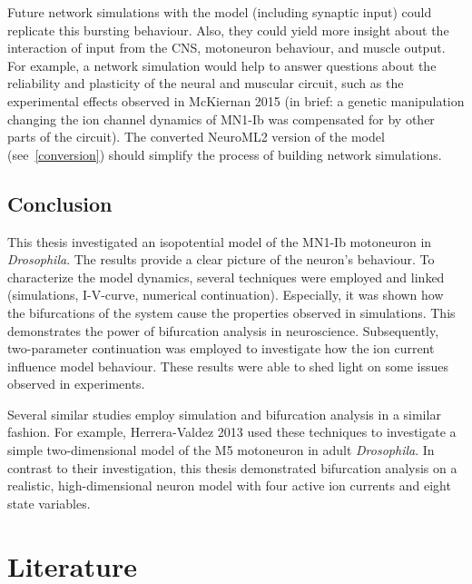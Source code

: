 \documentclass[12pt,a4paper,]{report}
\begin{document}
Future network simulations with the model (including synaptic input)
could replicate this bursting behaviour. Also, they could yield more
insight about the interaction of input from the CNS, motoneuron
behaviour, and muscle output. For example, a network simulation would
help to answer questions about the reliability and plasticity of the
neural and muscular circuit, such as the experimental effects observed
in McKiernan 2015 (in brief: a genetic manipulation changing the ion
channel dynamics of MN1-Ib was compensated for by other parts of the
circuit). The converted NeuroML2 version of the model
(see~\ref{conversion}) should simplify the process of building network
simulations.

\section{Conclusion}\label{conclusion}

This thesis investigated an isopotential model of the MN1-Ib motoneuron
in \emph{Drosophila}. The results provide a clear picture of the
neuron's behaviour. To characterize the model dynamics, several
techniques were employed and linked (simulations, I-V-curve, numerical
continuation). Especially, it was shown how the bifurcations of the
system cause the properties observed in simulations. This demonstrates
the power of bifurcation analysis in neuroscience. Subsequently,
two-parameter continuation was employed to investigate how the ion
current influence model behaviour. These results were able to shed light
on some issues observed in experiments.

Several similar studies employ simulation and bifurcation analysis in a
similar fashion. For example, Herrera-Valdez 2013 used these techniques
to investigate a simple two-dimensional model of the M5 motoneuron in
adult \emph{Drosophila}. In contrast to their investigation, this thesis
demonstrated bifurcation analysis on a realistic, high-dimensional
neuron model with four active ion currents and eight state variables.

\listoffigures
{}

\listoftables
{}

\chapter*{Literature}\label{literature}
\end{document}
